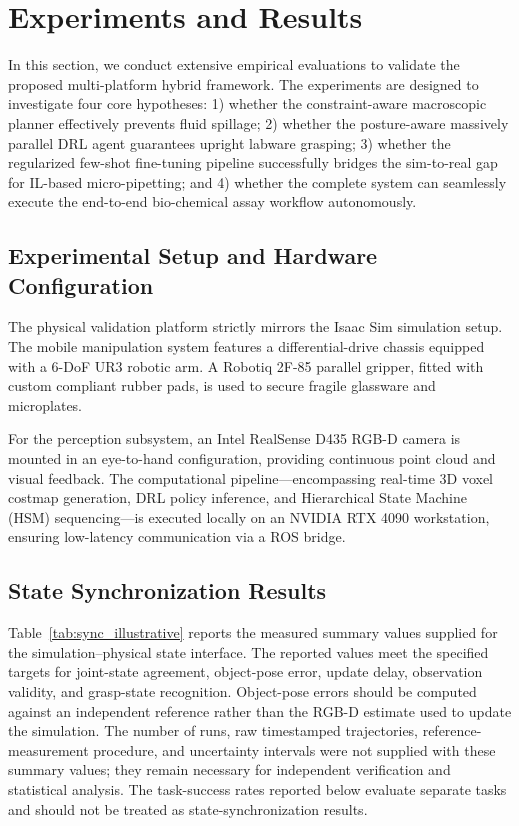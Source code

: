 \documentclass[journal,twocolumn]{IEEEtran}
\begin{document}
\section{Experiments and Results}
\label{sec:experiments}

In this section, we conduct extensive empirical evaluations to validate the proposed multi-platform hybrid framework. The experiments are designed to investigate four core hypotheses:
1) whether the constraint-aware macroscopic planner effectively prevents fluid spillage;
2) whether the posture-aware massively parallel DRL agent guarantees upright labware grasping;
3) whether the regularized few-shot fine-tuning pipeline successfully bridges the sim-to-real gap for IL-based micro-pipetting; and
4) whether the complete system can seamlessly execute the end-to-end bio-chemical assay workflow autonomously.

\subsection{Experimental Setup and Hardware Configuration}
\label{subsec:exp_setup}

The physical validation platform strictly mirrors the Isaac Sim simulation setup. The mobile manipulation system features a differential-drive chassis equipped with a 6-DoF UR3 robotic arm. A Robotiq 2F-85 parallel gripper, fitted with custom compliant rubber pads, is used to secure fragile glassware and microplates.

For the perception subsystem, an Intel RealSense D435 RGB-D camera is mounted in an eye-to-hand configuration, providing continuous point cloud and visual feedback. The computational pipeline---encompassing real-time 3D voxel costmap generation, DRL policy inference, and Hierarchical State Machine (HSM) sequencing---is executed locally on an NVIDIA RTX 4090 workstation, ensuring low-latency communication via a ROS bridge.


\subsection{State Synchronization Results}
\label{subsec:state_sync_eval}
Table~\ref{tab:sync_illustrative} reports the measured summary values supplied for the simulation--physical state interface. The reported values meet the specified targets for joint-state agreement, object-pose error, update delay, observation validity, and grasp-state recognition. Object-pose errors should be computed against an independent reference rather than the RGB-D estimate used to update the simulation. The number of runs, raw timestamped trajectories, reference-measurement procedure, and uncertainty intervals were not supplied with these summary values; they remain necessary for independent verification and statistical analysis. The task-success rates reported below evaluate separate tasks and should not be treated as state-synchronization results.
\end{document}
